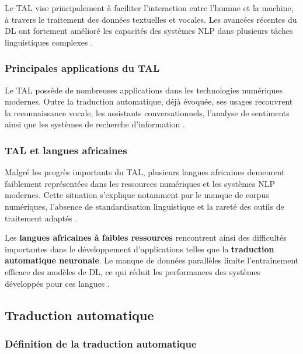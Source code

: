 Le \ac{TAL} vise principalement à faciliter l'interaction entre l'homme et la machine, à travers le traitement des données textuelles et vocales. Les avancées récentes du \ac{DL} ont fortement amélioré les capacités des systèmes \ac{NLP} dans plusieurs tâches linguistiques complexes \cite{vaswani2017attention}.

\subsubsection{Principales applications du \ac{TAL}}

Le \ac{TAL} possède de nombreuses applications dans les technologies numériques modernes. Outre la traduction automatique, déjà évoquée, ses usages recouvrent la reconnaissance vocale, les assistants conversationnels, l'analyse de sentiments ainsi que les systèmes de recherche d'information \cite{ranathunga2023neural}.

\subsubsection{\ac{TAL} et langues africaines}

Malgré les progrès importants du \ac{TAL}, plusieurs langues africaines demeurent faiblement représentées dans les ressources numériques et les systèmes \ac{NLP} modernes. Cette situation s'explique notamment par le manque de corpus numériques, l'absence de standardisation linguistique et la rareté des outils de traitement adaptés \cite{agyei2024low}.

Les \textbf{langues africaines à faibles ressources} rencontrent ainsi des difficultés importantes dans le développement d'applications telles que la \textbf{traduction automatique neuronale}. Le manque de données parallèles limite l'entraînement efficace des modèles de \ac{DL}, ce qui réduit les performances des systèmes développés pour ces langues \cite{mandiya2026lingala}.

\subsection{Traduction automatique}

\subsubsection{Définition de la traduction automatique}

